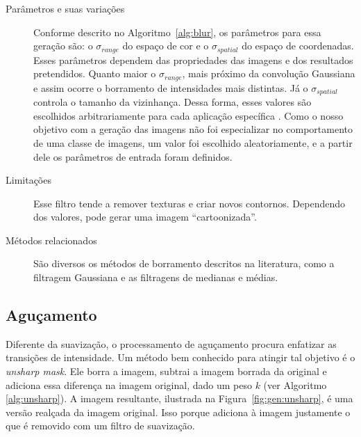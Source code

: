 \begin{description}
  \item[Parâmetros e suas variações] Conforme descrito no Algoritmo~\ref{alg:blur}, os parâmetros para essa geração são: o $\sigma_{range}$ do espaço de cor e o $\sigma_{spatial}$ do espaço de coordenadas. Esses parâmetros dependem das propriedades das imagens e dos resultados pretendidos. Quanto maior o $\sigma_{range}$, mais próximo da convolução Gaussiana e assim ocorre o borramento de intensidades mais distintas. Já o $\sigma_{spatial}$ controla o tamanho da vizinhança. Dessa forma, esses valores são escolhidos arbitrariamente para cada aplicação específica \cite{Tomasi1998}. Como o nosso objetivo com a geração das imagens não foi especializar no comportamento de uma classe de imagens, um valor foi escolhido aleatoriamente, e a partir dele os parâmetros de entrada foram definidos.

  \item[Limitações] Esse filtro tende a remover texturas e criar novos contornos. Dependendo dos valores, pode gerar uma imagem ``cartoonizada''.

  \item[Métodos relacionados] São diversos os métodos de borramento descritos na literatura, como a filtragem Gaussiana e as filtragens de medianas e médias.
\end{description}
\FloatBarrier
\subsection{Aguçamento}

Diferente da suavização, o processamento de aguçamento procura enfatizar as transições de intensidade. Um método bem conhecido para atingir tal objetivo é o \textit{unsharp mask}. Ele borra a imagem, subtrai a imagem borrada da original e adiciona essa diferença na imagem original, dado um peso $k$ (ver Algoritmo \ref{alg:unsharp}). A imagem resultante, ilustrada na Figura~\ref{fig:gen:unsharp}, é uma versão realçada da imagem original. Isso porque adiciona à imagem justamente o que é removido com um filtro de suavização.


